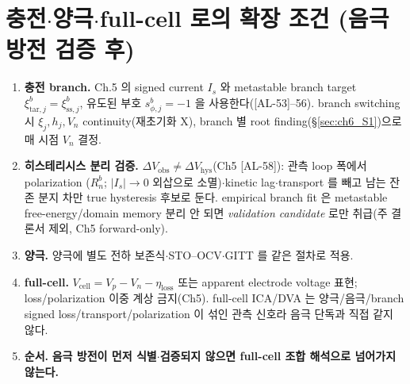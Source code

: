 \documentclass[11pt,a4paper]{article}
\newcommand{\cell}{\mathrm{cell}}
\newcommand{\sstat}{\mathrm{ss}}
\newcommand{\hys}{\mathrm{hys}}
\newcommand{\tar}{\mathrm{tar}}
\newcommand{\loss}{\mathrm{loss}}
\newcommand{\obs}{\mathrm{obs}}
\newcommand{\AL}[1]{\textsf{[AL-#1]}}
\begin{document}
\section{충전$\cdot$양극$\cdot$full-cell 로의 확장 조건 (음극 방전 검증 후)}\label{sec:ch6_extension}
\begin{enumerate}[label=E\arabic*),leftmargin=2.4em]
\item \textbf{충전 branch.} Ch.5 의 signed current $I_s$ 와 metastable branch target $\xi_{\tar,j}^b=\xi_{\sstat,j}^b$,
  유도된 부호 $s_{\phi,j}^b=-1$ 을 사용한다(\AL{53}--56). branch switching 시 $\xi_j,h_j,V_n$ continuity(재초기화 X),
  branch 별 root finding(\S\ref{sec:ch6_S1})으로 매 시점 $V_n$ 결정.
\item \textbf{히스테리시스 분리 검증.} $\Delta V_\obs\ne\Delta V_\hys$(Ch5 \AL{58}): 관측 loop 폭에서 polarization
  ($R_n^b$; $|I_s|\to0$ 외삽으로 소멸)$\cdot$kinetic lag$\cdot$transport 를 빼고 남는 잔존 분지 차만 true
  hysteresis 후보로 둔다. empirical branch fit 은 metastable free-energy/domain memory 분리 안 되면 \emph{validation
  candidate} 로만 취급(주 결론서 제외, Ch5 forward-only).
\item \textbf{양극.} 양극에 별도 전하 보존식$\cdot$STO--OCV$\cdot$GITT 를 같은 절차로 적용.
\item \textbf{full-cell.} $V_\cell=V_p-V_n-\eta_\loss$ 또는 apparent electrode voltage 표현; loss/polarization
  이중 계상 금지(Ch5). full-cell ICA/DVA 는 양극/음극/branch signed loss/transport/polarization 이 섞인 관측
  신호라 음극 단독과 직접 같지 않다.
\item \textbf{순서.} \textbf{음극 방전이 먼저 식별$\cdot$검증되지 않으면 full-cell 조합 해석으로 넘어가지 않는다.}
\end{enumerate}

\end{document}
